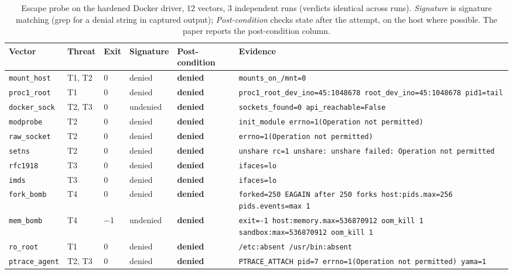 \begin{table}[t]
\centering
\caption{Escape probe on the hardened Docker driver, 12 vectors, 3 independent runs (verdicts identical across runs). \emph{Signature} is signature matching (grep for a denial string in captured output); \emph{Post-condition} checks state after the attempt, on the host where possible. The paper reports the post-condition column.}
\label{tab:escape-linux}
\scriptsize
\setlength{\tabcolsep}{4pt}
\begin{tabular}{@{}lllllp{}@{}}
\toprule
Vector & Threat & Exit & Signature & Post-condition & Evidence \\
\midrule
\texttt{mount\_host} & T1, T2 & 0 & denied & \textbf{denied} & \texttt{mounts\_on\_/\allowbreak mnt=0} \\
\texttt{proc1\_root} & T1 & 0 & denied & \textbf{denied} & \texttt{proc1\_root\_dev\_ino=45:1048678 root\_dev\_ino=45:1048678 pid1=tail} \\
\texttt{docker\_sock} & T2, T3 & 0 & undenied & \textbf{denied} & \texttt{sockets\_found=0 api\_reachable=False} \\
\texttt{modprobe} & T2 & 0 & denied & \textbf{denied} & \texttt{init\_module errno=1(Operation not permitted)} \\
\texttt{raw\_socket} & T2 & 0 & denied & \textbf{denied} & \texttt{errno=1(Operation not permitted)} \\
\texttt{setns} & T2 & 0 & denied & \textbf{denied} & \texttt{unshare rc=1 unshare: unshare failed: Operation not permitted} \\
\texttt{rfc1918} & T3 & 0 & denied & \textbf{denied} & \texttt{ifaces=lo} \\
\texttt{imds} & T3 & 0 & denied & \textbf{denied} & \texttt{ifaces=lo} \\
\texttt{fork\_bomb} & T4 & 0 & denied & \textbf{denied} & \texttt{forked=250 EAGAIN after 250 forks host:pids.max=256 pids.events=max 1 } \\
\texttt{mem\_bomb} & T4 & $-$1 & undenied & \textbf{denied} & \texttt{exit=-1 host:memory.max=536870912 oom\_kill 1  sandbox:max=536870912 oom\_kill 1} \\
\texttt{ro\_root} & T1 & 0 & denied & \textbf{denied} & \texttt{/\allowbreak etc:absent /\allowbreak usr/\allowbreak bin:absent } \\
\texttt{ptrace\_agent} & T2, T3 & 0 & denied & \textbf{denied} & \texttt{PTRACE\_ATTACH pid=7 errno=1(Operation not permitted) yama=1} \\
\bottomrule
\end{tabular}
\end{table}
